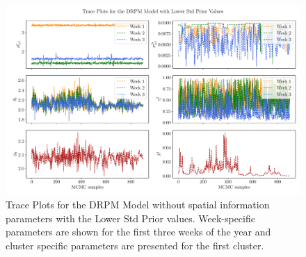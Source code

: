 \documentclass[12pt,a4paper]{article}
\begin{document}
\begin{figure}
    \centering
    \includegraphics[width=.99\linewidth]{./imgs/drpm/drpm_lower_std_trace_plots.pdf}
    \caption{Trace Plots for the DRPM Model without spatial information parameters with the Lower Std Prior values. 
    Week-specific
    parameters are shown for the first three weeks of the year and cluster specific parameters are
    presented for the first cluster.}
    \label{fig:drpm_lower_std_trace_plots}
\end{figure}
\end{document}
